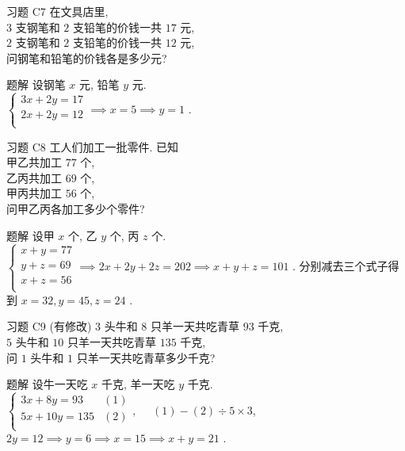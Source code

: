 \documentclass[content.tex]{subfiles}
\begin{document}
\begin{frame}{习题 C7}
在文具店里, \\
$3$ 支钢笔和 $2$ 支铅笔的价钱一共 $17$ 元, \\
$2$ 支钢笔和 $2$ 支铅笔的价钱一共 $12$ 元, \\
问钢笔和铅笔的价钱各是多少元?
\begin{exampleblock}{题解}
设钢笔 $x$ 元, 铅笔 $y$ 元. \\
$
\begin{cases}
3x + 2y = 17 \\
2x + 2y = 12 \\
\end{cases}
\implies x = 5 \implies y = 1 
$ .
\end{exampleblock}
\end{frame}

\begin{frame}{习题 C8}
工人们加工一批零件. 已知\\
甲乙共加工 $77$ 个, \\
乙丙共加工 $69$ 个, \\
甲丙共加工 $56$ 个, \\
问甲乙丙各加工多少个零件?
\begin{exampleblock}{题解}
设甲 $x$ 个, 乙 $y$ 个, 丙 $z$ 个. \\
$
\begin{cases}
x + y = 77 \\
y + z = 69 \\
x + z = 56 \\
\end{cases}
\implies 2x + 2y + 2z = 202 \implies x + y + z = 101 
$ . 分别减去三个式子得到 $x = 32, y = 45, z = 24$ .
\end{exampleblock}
\end{frame}

\begin{frame}{习题 C9 (有修改)}
$3$ 头牛和 $8$ 只羊一天共吃青草 $93$ 千克, \\
$5$ 头牛和 $10$ 只羊一天共吃青草 $135$ 千克, \\
问 $1$ 头牛和 $1$ 只羊一天共吃青草多少千克?
\begin{exampleblock}{题解}
设牛一天吃 $x$ 千克, 羊一天吃 $y$ 千克. \\
$
\begin{cases}
3x + 8y = 93   & (1) \\
5x + 10y = 135 & (2) \\
\end{cases}, \quad
$ $(1) - (2) \div 5 \times 3$, \\
$2y=12\implies y = 6\implies x = 15\implies x + y = 21$ .
\end{exampleblock}
\end{frame}
\end{document}
